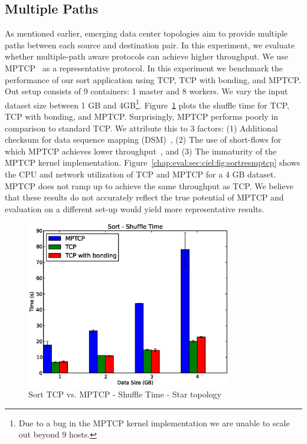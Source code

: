 \documentclass[a4paper,12pt,twoside,openright]{report}
\begin{document}
\subsection{Multiple Paths}
As mentioned earlier, emerging data center topologies aim to provide multiple
paths between each source and destination pair. In this experiment, we evaluate
whether multiple-path aware protocols can achieve higher throughput. We use
MPTCP~\cite{Raiciu:2012:HHC} as a representative protocol. In this experiment we
benchmark the performance of our sort application using TCP, TCP with bonding,
and MPTCP. Out setup consists of 9 containers: 1 master and 8 workers. We vary
the input dataset size between 1 GB and 4GB\footnote{Due to a bug in the MPTCP
kernel implementation we are unable to scale out beyond 9 hosts.}.
Figure~\ref{chap:eval:sec:ciel:fig:sortshufflemptcp} plots the shuffle time for
TCP, TCP with bonding, and MPTCP. Surprisingly, MPTCP performs poorly in
comparison to standard TCP. We attribute this to 3 factors: (1) Additional
checksum for data sequence mapping (DSM)~\cite{Raiciu:2012:HHC}, (2) The use of
short-flows for which MPTCP achieves lower throughput~\cite{Raiciu:2010:DCN},
and (3) The immaturity of the MPTCP kernel implementation.
Figure~\ref{chap:eval:sec:ciel:fig:sortresmptcp} shows the CPU and network
utilization of TCP and MPTCP for a 4 GB dataset. MPTCP does not ramp up to
achieve the same throughput as TCP. We believe that these results do not
accurately reflect the true potential of MPTCP and evaluation on a different
set-up would yield more representative results.


 \begin{figure}[h!]
  \centering
    \includegraphics[width=0.8\textwidth]{shuffle_sort_mptcp.eps}
    \caption{Sort TCP vs. MPTCP - Shuffle Time - Star topology}
    \label{chap:eval:sec:ciel:fig:sortshufflemptcp}
\end{figure}
\end{document}
